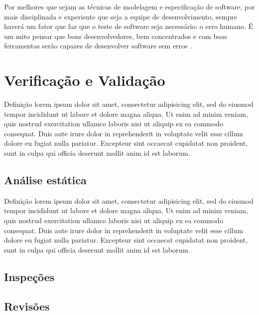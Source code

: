 \documentclass[
	12pt,				%
	openright,			%
	twoside,			%
	a4paper,			%
	english,			%
	brazil,				%
	]{abntex2}
\begin{document}
\begin{citacao}
Por melhores que sejam as técnicas de modelagem e especificação de software, por mais disciplinada e experiente que seja a equipe de desenvolvimento, sempre haverá um fator que faz que o teste de software seja necessário: o erro humano. É um mito pensar que bons desenvolvedores, bem concentrados e com boas ferramentas serão capazes de desenvolver software sem erros . %
\end{citacao}


\section{Verificação e Validação}

Definição lorem ipsum dolor sit amet, consectetur adipisicing elit, sed do eiusmod
tempor incididunt ut labore et dolore magna aliqua. Ut enim ad minim veniam,
quis nostrud exercitation ullamco laboris nisi ut aliquip ex ea commodo
consequat. Duis aute irure dolor in reprehenderit in voluptate velit esse
cillum dolore eu fugiat nulla pariatur. Excepteur sint occaecat cupidatat non
proident, sunt in culpa qui officia deserunt mollit anim id est laborum.


\subsection{Análise estática}

Definição lorem ipsum dolor sit amet, consectetur adipisicing elit, sed do eiusmod
tempor incididunt ut labore et dolore magna aliqua. Ut enim ad minim veniam,
quis nostrud exercitation ullamco laboris nisi ut aliquip ex ea commodo
consequat. Duis aute irure dolor in reprehenderit in voluptate velit esse
cillum dolore eu fugiat nulla pariatur. Excepteur sint occaecat cupidatat non
proident, sunt in culpa qui officia deserunt mollit anim id est laborum.


\subsection{Inspeções}


\subsection{Revisões}
\end{document}
